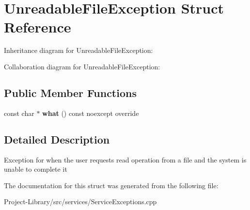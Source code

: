 \hypertarget{structUnreadableFileException}{}\section{Unreadable\+File\+Exception Struct Reference}
\label{structUnreadableFileException}


Inheritance diagram for Unreadable\+File\+Exception\+:


Collaboration diagram for Unreadable\+File\+Exception\+:
\subsection*{Public Member Functions}
\begin{DoxyCompactItemize}
\item 
\mbox{\label{structUnreadableFileException_a9c75712a0e08f141e4b499879d69292b}} 
const char $\ast$ {\bfseries what} () const noexcept override
\end{DoxyCompactItemize}


\subsection{Detailed Description}
Exception for when the user requests read operation from a file and the system is unable to complete it 

The documentation for this struct was generated from the following file\+:\begin{DoxyCompactItemize}
\item 
Project-\/\+Library/src/services/Service\+Exceptions.\+cpp\end{DoxyCompactItemize}
